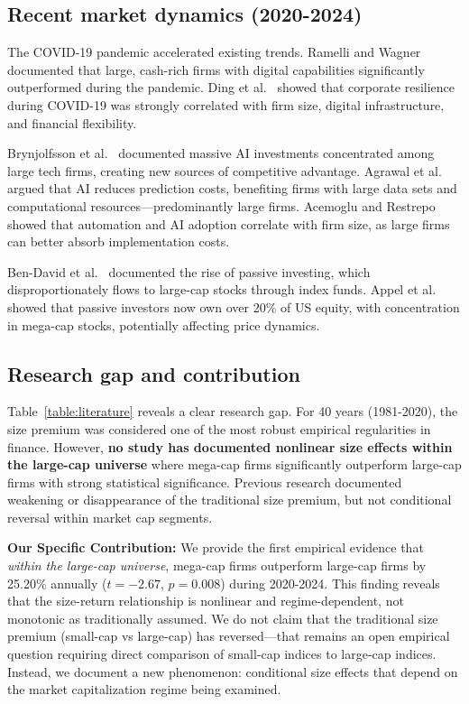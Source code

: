 \documentclass[10pt,letterpaper]{article}
\begin{document}
\subsection*{Recent market dynamics (2020-2024)}

The COVID-19 pandemic accelerated existing trends. Ramelli and Wagner~\cite{ramelli2020} documented that large, cash-rich firms with digital capabilities significantly outperformed during the pandemic. Ding et al.~\cite{ding2021} showed that corporate resilience during COVID-19 was strongly correlated with firm size, digital infrastructure, and financial flexibility.

Brynjolfsson et al.~\cite{brynjolfsson2021} documented massive AI investments concentrated among large tech firms, creating new sources of competitive advantage. Agrawal et al.~\cite{agrawal2019} argued that AI reduces prediction costs, benefiting firms with large data sets and computational resources---predominantly large firms. Acemoglu and Restrepo~\cite{acemoglu2020} showed that automation and AI adoption correlate with firm size, as large firms can better absorb implementation costs.

Ben-David et al.~\cite{bendavid2018} documented the rise of passive investing, which disproportionately flows to large-cap stocks through index funds. Appel et al.~\cite{appel2016} showed that passive investors now own over 20\% of US equity, with concentration in mega-cap stocks, potentially affecting price dynamics.

\subsection*{Research gap and contribution}

Table~\ref{table:literature} reveals a clear research gap. For 40 years (1981-2020), the size premium was considered one of the most robust empirical regularities in finance. However, \textbf{no study has documented nonlinear size effects within the large-cap universe} where mega-cap firms significantly outperform large-cap firms with strong statistical significance. Previous research documented weakening or disappearance of the traditional size premium, but not conditional reversal within market cap segments.

\textbf{Our Specific Contribution:} We provide the first empirical evidence that \textit{within the large-cap universe}, mega-cap firms outperform large-cap firms by 25.20\% annually ($t=-2.67$, $p=0.008$) during 2020-2024. This finding reveals that the size-return relationship is nonlinear and regime-dependent, not monotonic as traditionally assumed. We do not claim that the traditional size premium (small-cap vs large-cap) has reversed---that remains an open empirical question requiring direct comparison of small-cap indices to large-cap indices. Instead, we document a new phenomenon: conditional size effects that depend on the market capitalization regime being examined.
\end{document}
